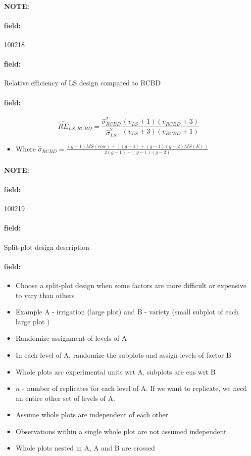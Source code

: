 \documentclass[12pt]{article}
\newenvironment{note}{\paragraph{NOTE:}}{}
\newenvironment{field}{\paragraph{field:}}{}
\begin{document}
\begin{note}
    \begin{field}
        \tiny 100218
    \end{field}
    \begin{field}
        Relative efficiency of LS design compared to RCBD
    \end{field}
    \begin{field}
        $$ \widehat{RE}_{LS,RCBD} = \frac{\hat{\sigma}_{RCBD}^2}{\hat{\sigma}_{LS}^2} \frac{(v_{LS} + 1)(v_{RCBD} + 3)}{(v_{LS} + 3)(v_{RCBD} + 1)}$$
        \begin{itemize}
          \item Where $\hat{\sigma}_{RCBD} = \frac{(g-1)MS(row) + ((g-1) + (g-1)(g-2)MS(E))}{2(g-1) + (g-1)(g-2)}$
        \end{itemize}
    \end{field}
\end{note}


\begin{note}
    \begin{field}
        \tiny 100219
    \end{field}
    \begin{field}
        Split-plot design description
    \end{field}
    \begin{field}
        \begin{itemize}
          \item Choose a split-plot design when some factors are more difficult or expensive to vary than others
          \item Example A - irrigation (large plot) and B - variety (small subplot of each large plot )
          \item Randomize assignment of levels of A
          \item In each level of A, randomize the subplots and assign levels of factor B
          \item Whole plots are experimental units wrt A, subplots are eus wrt B
          \item $n$ - number of replicates for each level of A. If we want to replicate, we need an entire other set of levels of A.
          \item Assume whole plots are independent of each other
          \item Observations within a single whole plot are not assumed independent
          \item Whole plots nested in A, A and B are crossed
        \end{itemize}
    \end{field}
\end{note}
\end{document}
